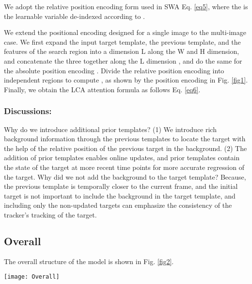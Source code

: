 \documentclass[letterpaper]{article} \usepackage{aaai23}  \usepackage{times}  \usepackage{helvet}  \usepackage{courier}  \usepackage[hyphens]{url}  \usepackage{graphicx} \urlstyle{rm} \def\UrlFont{\rm}  \usepackage{natbib}  \usepackage{caption} \frenchspacing  \setlength{\pdfpagewidth}{8.5in}  \setlength{\pdfpageheight}{11in}  \usepackage{algorithm}
\begin{document}
We adopt the relative position encoding  form used in SWA \cite{swin} Eq. \ref{eq5}, where the  is the learnable variable de-indexed according to .

We extend the positional encoding designed for a single image to the multi-image case. We first expand the input target template, the previous template, and the features of the search region into a dimension L along the W and H dimension, and concatenate the three together along the L dimension , and do the same for the absolute position encoding . Divide the relative position encoding  into  independent regions to compute , as shown by the position encoding in Fig. \ref{fig1}. Finally, we obtain the LCA attention formula as follows Eq. \ref{eq6}.
 

\subsubsection{Discussions:}
Why do we introduce additional prior templates? (1) We introduce rich background information through the previous templates to locate the target with the help of the relative position of the previous target in the background. (2) The addition of prior templates enables online updates, and prior templates contain the state of the target at more recent time points for more accurate regression of the target. Why did we not add the background to the target template? Because, the previous template is temporally closer to the current frame, and the initial target is not important to include the background in the target template, and including only the non-updated targets can emphasize the consistency of the tracker's tracking of the target.

\subsection{Overall}

The overall structure of the model is shown in Fig. \ref{fig2}.

\begin{figure*}[t]
\centering
\texttt{[image: Overall]} \caption{We construct a target-aware backbone network based on alternating stacks of LCA and shift window attention (SWA) module of Swin-Transformer. The target-aware features extracted by the backbone network are further refined by a neck consisting of multiple layers of LCAs to refine the state information of the target. Finally, only the features of the search image part are taken for the feature maps of the regression and classification head.}
\label{fig2}
\end{figure*}
\end{document}
